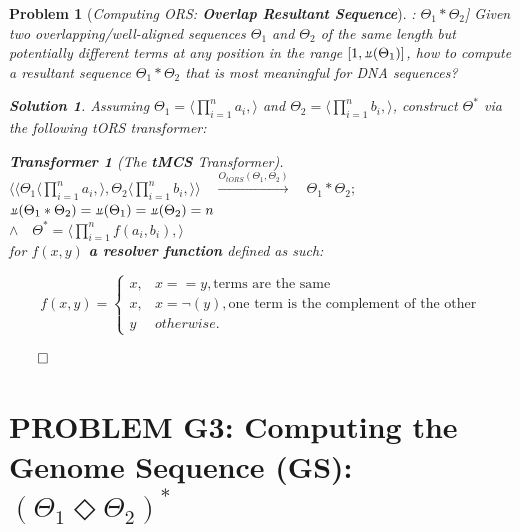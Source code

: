 \documentclass[a4paper, 18pt]{book} %
\newtheorem{transf}{Transformer}
\newtheorem{prob}{Problem}
\newtheorem{soln}{Solution}
\newcommand{\invpi}{\rotatebox[origin=c]{180}{$\pi$}}
\begin{document}
\begin{prob}[\textit{Computing ORS: \textbf{Overlap Resultant Sequence}}]: $\Theta_1 \ast \Theta_2$] 
\label{PROBORS}
Given two overlapping/well-aligned sequences $\Theta_1$ and $\Theta_2$ of the same length but potentially different terms at any position in the range $[1, \invpi(\Theta_1)]$, how to compute a resultant sequence $\Theta_1 \ast \Theta_2$ that is most meaningful for DNA sequences?

\begin{soln}
\label{SOLORS}
Assuming $\Theta_1 = \langle \prod\limits_{i=1}^n a_i, \rangle$ and $\Theta_2 = \langle \prod\limits_{i=1}^n b_i, \rangle$, construct $\Theta^*$ via the following tORS transformer:

\begin{transf}[The \textbf{tMCS} Transformer]$ $\\
\label{TRANSFMCS}
$\langle\langle \Theta_1\langle \prod\limits_{i=1}^n a_i, \rangle, \Theta_2\langle \prod\limits_{i=1}^n b_i, \rangle \rangle  \quad \xrightarrow{O_{tORS}(\Theta_1,\Theta_2)} \quad \Theta_1 \ast \Theta_2;$\\
$\invpi(\Theta_1 \ast \Theta_2) = \invpi(\Theta_1) = \invpi(\Theta_2) = n$\\
$\land \quad \Theta^* = \langle \prod\limits_{i=1}^n f(a_i,b_i), \rangle$\\
 for $f(x,y)$ \textbf{a resolver function} defined as such:

\[
f(x,y) = 
\begin{cases}
x, & x == y, \text{terms are the same}\\
x, & x = \lnot(y), \text{one term is the complement of the other}\\
y & otherwise.
\end{cases}
\]

\end{transf}
$\qed$
\end{soln}
\end{prob}

\section{PROBLEM G3: Computing the Genome Sequence (GS): $(\Theta_1 \Diamond \Theta_2)^*$}
\label{SECCOMPGENSEQ}
\end{document}
